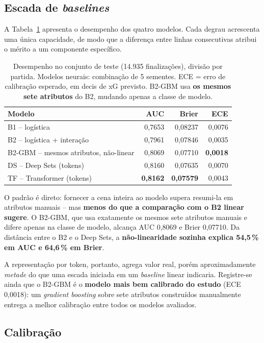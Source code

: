 \documentclass[12pt]{article}
\begin{document}
\subsection{Escada de \emph{baselines}}

A Tabela~\ref{tab:resultados} apresenta o desempenho dos quatro modelos. Cada
degrau acrescenta uma única capacidade, de modo que a diferença entre linhas
consecutivas atribui o mérito a um componente específico.

\begin{table}[ht]
\centering
\caption{Desempenho no conjunto de teste (14.935 finalizações), divisão por
partida. Modelos neurais: combinação de 5 sementes. ECE = erro de calibração
esperado, em decis de xG previsto. B2-GBM usa \textbf{os mesmos sete atributos}
do B2, mudando apenas a classe de modelo.}
\label{tab:resultados}
\begin{tabular}{@{}lrrr@{}}
\toprule
Modelo & AUC & Brier & ECE \\
\midrule
B1 -- logística & 0,7653 & 0,08237 & 0,0076 \\
B2 -- logística + interação & 0,7961 & 0,07846 & 0,0035 \\
B2-GBM -- mesmos atributos, não-linear & 0,8069 & 0,07710 & \textbf{0,0018} \\
DS -- Deep Sets (tokens) & 0,8160 & 0,07635 & 0,0070 \\
TF -- Transformer (tokens) & \textbf{0,8162} & \textbf{0,07579} & 0,0043 \\
\bottomrule
\end{tabular}
\end{table}

O padrão é direto: fornecer a cena inteira ao
modelo supera resumi-la em atributos manuais -- mas \textbf{menos do que a
comparação com o B2 linear sugere}. O B2-GBM, que usa exatamente os mesmos sete
atributos manuais e difere apenas na classe de modelo, alcança AUC 0,8069 e Brier
0,07710. Da distância entre o B2 e o Deep Sets, a \textbf{não-linearidade sozinha
explica 54,5\,\% em AUC e 64,6\,\% em Brier}.

A representação por token, portanto, agrega valor real, porém aproximadamente
\emph{metade} do que uma escada iniciada em um \emph{baseline} linear indicaria.
Registre-se ainda que o B2-GBM é o \textbf{modelo mais bem calibrado do estudo}
(ECE 0,0018): um \emph{gradient boosting} sobre sete atributos construídos
manualmente entrega a melhor calibração entre todos os modelos avaliados.

\subsection{Calibração}
\end{document}
